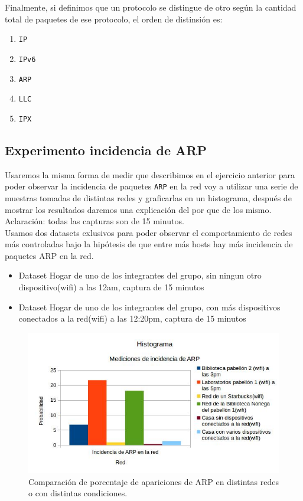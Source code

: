 Finalmente, si definimos que un protocolo se distingue de otro según la cantidad total de paquetes de ese protocolo, el orden de distinsión es:

\begin{enumerate}
\item \texttt{IP}
\item \texttt{IPv6}
\item \texttt{ARP}
\item \texttt{LLC}
\item \texttt{IPX}
\end{enumerate}


\subsection{Experimento incidencia de ARP}

Usaremos la misma forma de medir que describimos en el ejercicio anterior para poder observar la incidencia de paquetes \texttt{ARP} en la red voy a utilizar una serie de muestras
tomadas de distintas redes y graficarlas en un histograma, después de mostrar los resultados daremos una explicación del por que de los mismo. Aclaración: todas las capturas
son de 15 minutos.\\

Usamos dos datasets exlusivos para poder observar el comportamiento de redes más controladas bajo la hipótesis de que entre más hosts hay más incidencia de paquetes ARP en la red.\\

\begin{itemize}
\item Dataset Hogar de uno de los integrantes del grupo, sin ningun otro dispositivo(wifi) a las 12am, captura de 15 minutos
\item Dataset Hogar de uno de los integrantes del grupo, con más dispositivos conectados a la red(wifi) a las 12:20pm, captura de 15 minutos
\end{itemize}

\begin{figure}[H]
\centering
\includegraphics[width=150mm]{imagenes/IncidenciaARP.jpg}
\caption{Comparación de porcentaje de apariciones de ARP en distintas redes o con distintas condiciones.\label{overflow}}
\end{figure}

